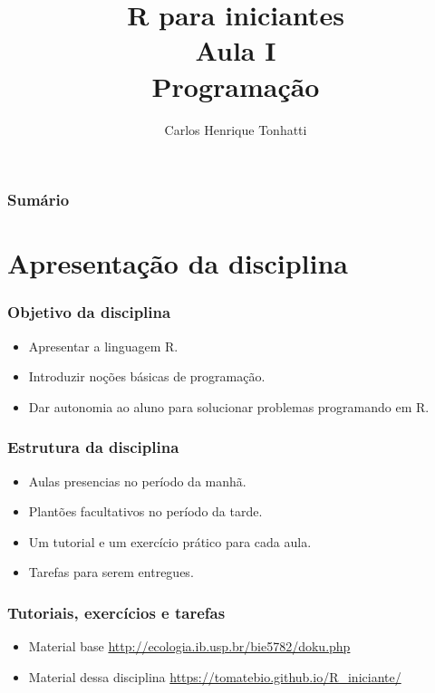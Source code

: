 \documentclass[handout]{beamer}
\title[Linguagem R]{R para iniciantes\\ Aula I \\ Programação}
\author {Carlos Henrique Tonhatti}
\date{}
\begin{document}
\frame{\titlepage} %


\begin{frame}
 \frametitle{Sumário}
 \tableofcontents[pausesections]
  \setcounter{tocdepth}{2}%
\end{frame}

\section{Apresentação da disciplina}
\begin{frame}
  \begin{center}
  \frametitle{Objetivo da disciplina}

  \begin{itemize}
  \item Apresentar a linguagem R. 
  \item Introduzir noções básicas de programação.
  \item Dar autonomia ao aluno para solucionar problemas programando em R. 
 \end{itemize}
\end{center}
\end{frame}


\begin{frame}
\begin{center}
  \frametitle{Estrutura da disciplina}
  \begin{itemize}
  \item Aulas presencias no período da manhã.
  \item Plantões  facultativos no  período da tarde.
  \item Um tutorial e um exercício prático para cada aula.
  \item Tarefas para serem entregues.
  \end{itemize}
\end{center}
\end{frame}



\begin{frame}
  \begin{center}
  \frametitle{Tutoriais, exercícios e tarefas}
  \begin{itemize}
  \item Material base \url{http://ecologia.ib.usp.br/bie5782/doku.php}
  \item Material dessa disciplina \url{https://tomatebio.github.io/R_iniciante/}
  \end{itemize}
\end{center}
\end{frame}
\end{document}
